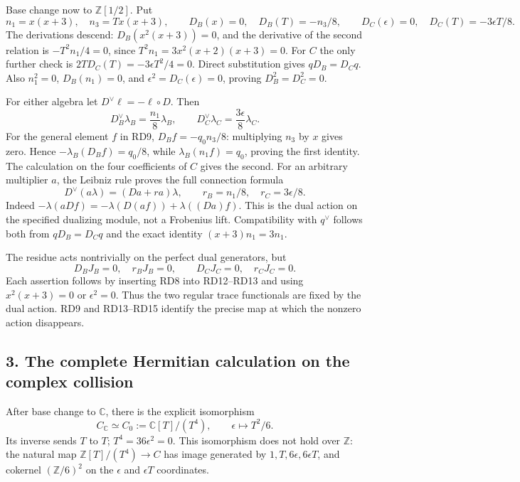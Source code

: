 \documentclass[
  10pt,
  a4paper,
]{article}
\begin{document}
Base change now to \(\mathbb Z[1/2]\). Put \[
n_1=x(x+3),\quad n_3=Tx(x+3),\qquad
D_B(x)=0,\quad D_B(T)=-n_3/8,\qquad
D_C(\epsilon)=0,\quad D_C(T)=-3\epsilon T/8.
\tag{RD12}
\] The derivations descend: \(D_B(x^2(x+3))=0\), and the derivative of
the second relation is \(-T^2n_1/4=0\), since
\(T^2n_1=3x^2(x+2)(x+3)=0\). For \(C\) the only further check is
\(2TD_C(T)=-3\epsilon T^2/4=0\). Direct substitution gives
\(qD_B=D_Cq\). Also \(n_1^2=0\), \(D_B(n_1)=0\), and
\(\epsilon^2=D_C(\epsilon)=0\), proving \(D_B^2=D_C^2=0\).

For either algebra let \(D^\vee\ell=-\ell\circ D\). Then \[
D_B^\vee\lambda_B=\frac{n_1}{8}\lambda_B,\qquad
D_C^\vee\lambda_C=\frac{3\epsilon}{8}\lambda_C.
\tag{RD13}
\] For the general element \(f\) in RD9, \(D_Bf=-q_0n_3/8\): multiplying
\(n_3\) by \(x\) gives zero. Hence \(-\lambda_B(D_Bf)=q_0/8\), while
\(\lambda_B(n_1f)=q_0\), proving the first identity. The calculation on
the four coefficients of \(C\) gives the second. For an arbitrary
multiplier \(a\), the Leibniz rule proves the full connection formula \[
D^\vee(a\lambda)=(Da+ra)\lambda,\qquad
r_B=n_1/8,\quad r_C=3\epsilon/8.
\tag{RD14}
\] Indeed \(-\lambda(aDf)=-\lambda(D(af))+\lambda((Da)f)\). This is the
dual action on the specified dualizing module, not a Frobenius lift.
Compatibility with \(q^\vee\) follows both from \(qD_B=D_Cq\) and the
exact identity \((x+3)n_1=3n_1\).

The residue acts nontrivially on the perfect dual generators, but \[
D_BJ_B=0,\quad r_BJ_B=0,\qquad
D_CJ_C=0,\quad r_CJ_C=0.
\tag{RD15}
\] Each assertion follows by inserting RD8 into RD12--RD13 and using
\(x^2(x+3)=0\) or \(\epsilon^2=0\). Thus the two regular trace
functionals are fixed by the dual action. RD9 and RD13--RD15 identify
the precise map at which the nonzero action disappears.

\subsection{3. The complete Hermitian calculation on the complex
collision}\label{the-complete-hermitian-calculation-on-the-complex-collision}

After base change to \(\mathbb C\), there is the explicit isomorphism \[
C_{\mathbb C}\simeq C_0:=\mathbb C[T]/(T^4),\qquad
\epsilon\longmapsto T^2/6.
\tag{RD16}
\] Its inverse sends \(T\) to \(T\); \(T^4=36\epsilon^2=0\). This
isomorphism does not hold over \(\mathbb Z\): the natural map
\(\mathbb Z[T]/(T^4)\to C\) has image generated by
\(1,T,6\epsilon,6\epsilon T\), and cokernel \((\mathbb Z/6)^2\) on the
\(\epsilon\) and \(\epsilon T\) coordinates.
\end{document}
